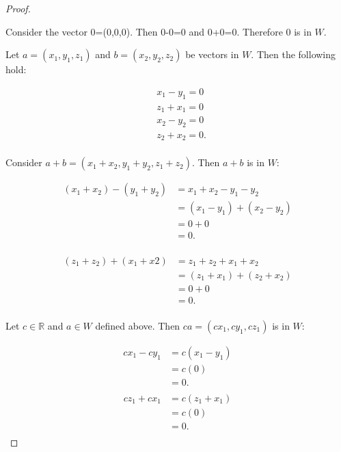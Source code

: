 \documentclass[12pt]{article}
\begin{document}
\begin{proof} 

\begin{flushleft} Consider the vector 0=(0,0,0). Then 0-0=0 and 0+0=0. Therefore 0 is in $W$. \end{flushleft}

\begin{flushleft} Let $a=(x_{1}, y_{1}, z_{1})$ and $b=(x_{2}, y_{2}, z_{2})$ be vectors in $W$. Then the following hold: \end{flushleft}

\begin{align*}
	& x_{1}-y_{1}=0 \\
	& z_{1}+x_{1}=0 \\
	& x_{2}-y_{2}=0 \\
	&z_{2}+x_{2}=0 . \\ 
\end{align*}
	
\begin{flushleft} Consider $a+b = (x_{1}+x_{2}, y_{1}+y_{2}, z_{1}+z_{2})$. Then $a+b$ is in $W$: \end{flushleft}

\begin{align*}
(x_{1}+x_{2}) - (y_{1}+y_{2}) &= x_{1} + x_{2} - y_{1} - y_{2} \\
					    &= (x_{1}-y_{1}) + (x_{2}-y_{2}) \\
					    &= 0+0 \\
					    &= 0 . \\ 
\end{align*}

\begin{align*}
(z_{1}+z_{2}) + (x_{1}+x{2}) &= z_{1} + z_{2} + x_{1} + x_{2} \\
					   &= (z_{1}+x_{1}) + (z_{2}+x_{2}) \\
					   &= 0+0 \\
					   &= 0 . \\ 
\end{align*}

\begin{flushleft} Let $c \in \mathbb{R}$ and $a \in W$ defined above. Then $ca=(cx_{1}, cy_{1}, cz_{1})$ is in $W$: \end{flushleft}

\begin{align*}
	cx_{1}-cy_{1} &= c(x_{1}-y_{1}) \\
			     &= c(0) \\
			     &= 0 . \\  
\end{align*}
\begin{align*}
	cz_{1}+cx_{1} &= c(z_{1}+x_{1}) \\
			      &= c(0) \\
			      &= 0 . \\ 
\end{align*}


\end{proof}
\end{document}
